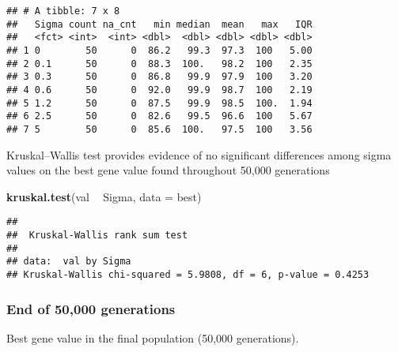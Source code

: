 \documentclass[]{book}
\newenvironment{Shaded}{\begin{snugshade}}{\end{snugshade}}
\newcommand{\DataTypeTok}[1]{\textcolor[rgb]{0.13,0.29,0.53}{#1}}
\newcommand{\KeywordTok}[1]{\textcolor[rgb]{0.13,0.29,0.53}{\textbf{#1}}}
\newcommand{\NormalTok}[1]{#1}
\newcommand{\OperatorTok}[1]{\textcolor[rgb]{0.81,0.36,0.00}{\textbf{#1}}}
\newcommand{\StringTok}[1]{\textcolor[rgb]{0.31,0.60,0.02}{#1}}
\begin{document}
\begin{verbatim}
## # A tibble: 7 x 8
##   Sigma count na_cnt   min median  mean   max   IQR
##   <fct> <int>  <int> <dbl>  <dbl> <dbl> <dbl> <dbl>
## 1 0        50      0  86.2   99.3  97.3  100   5.00
## 2 0.1      50      0  88.3  100.   98.2  100   2.35
## 3 0.3      50      0  86.8   99.9  97.9  100   3.20
## 4 0.6      50      0  92.0   99.9  98.7  100   2.19
## 5 1.2      50      0  87.5   99.9  98.5  100.  1.94
## 6 2.5      50      0  82.6   99.5  96.6  100   5.67
## 7 5        50      0  85.6  100.   97.5  100   3.56
\end{verbatim}

Kruskal--Wallis test provides evidence of no significant differences among sigma values on the best gene value found throughout 50,000 generations

\begin{Shaded}
\begin{Highlighting}[]
\KeywordTok{kruskal.test}\NormalTok{(val }\OperatorTok{~}\StringTok{ }\NormalTok{Sigma, }\DataTypeTok{data =}\NormalTok{ best)}
\end{Highlighting}
\end{Shaded}

\begin{verbatim}
## 
##  Kruskal-Wallis rank sum test
## 
## data:  val by Sigma
## Kruskal-Wallis chi-squared = 5.9808, df = 6, p-value = 0.4253
\end{verbatim}

\hypertarget{end-of-50000-generations-25}{%
\subsubsection{End of 50,000 generations}\label{end-of-50000-generations-25}}

Best gene value in the final population (50,000 generations).
\end{document}
